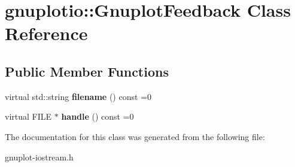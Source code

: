 \hypertarget{classgnuplotio_1_1GnuplotFeedback}{}\section{gnuplotio\+:\+:Gnuplot\+Feedback Class Reference}
\label{classgnuplotio_1_1GnuplotFeedback}
\subsection*{Public Member Functions}
\begin{DoxyCompactItemize}
\item 
\mbox{\label{classgnuplotio_1_1GnuplotFeedback_a081d4d59ffd81e2322c07c0a802e1307}} 
virtual std\+::string {\bfseries filename} () const =0
\item 
\mbox{\label{classgnuplotio_1_1GnuplotFeedback_a13ae87ba489bfbe87f64b8b54e8a4563}} 
virtual F\+I\+LE $\ast$ {\bfseries handle} () const =0
\end{DoxyCompactItemize}


The documentation for this class was generated from the following file\+:\begin{DoxyCompactItemize}
\item 
gnuplot-\/iostream.\+h\end{DoxyCompactItemize}

